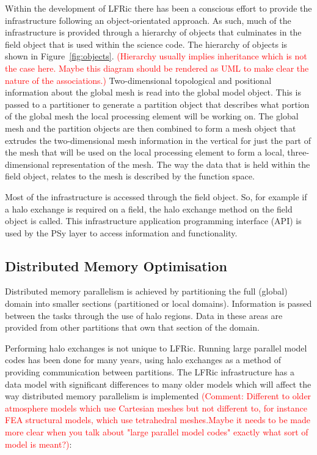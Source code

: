 \documentclass[times]{elsarticle}
\begin{document}
Within the development of LFRic there has been a conscious effort to
provide the infrastructure following an object-orientated approach. As
such, much of the infrastructure is provided through a hierarchy of
objects that culminates in the field object that is used within the
science code. The hierarchy of objects is shown in
Figure~\ref{fig:objects}. 
\textcolor{red}{(Hierarchy usually implies inheritance which is not the case here. 
Maybe this diagram should be rendered as UML to make clear the nature of the associations.)}
Two-dimensional topological and positional
information about the global mesh is read into the global model object.
This is passed to a partitioner to generate a partition object that
describes what portion of the global mesh the local processing element
will be working on. The global mesh and the partition objects are then
combined to form a mesh object that extrudes the two-dimensional mesh
information in the vertical for just the part of the mesh that will be
used on the local processing element to form a local, three-dimensional
representation of the mesh. The way the data that is held within the
field object, relates to the mesh is described by the function space.

Most of the infrastructure is accessed through the field object. So, for
example if a halo exchange is required on a field, the halo exchange
method on the field object is called. This infrastructure application
programming interface (API) is used by the PSy layer to access
information and functionality.

\subsection{\label{sec:distmem}Distributed Memory Optimisation}

Distributed memory parallelism is achieved by partitioning the full
(global) domain into smaller sections (partitioned or local domains).
Information is passed between the tasks through the use of halo regions.
Data in these areas are provided from other partitions that own that
section of the domain.

Performing halo exchanges is not unique to LFRic. Running large parallel
model codes has been done for many years, using halo exchanges as a
method of providing communication between partitions. The LFRic
infrastructure has a data model with significant differences to many
older models which will affect the way distributed memory parallelism is
implemented \textcolor{red}{(Comment: Different to older atmosphere models 
which use Cartesian meshes but not different to, for instance FEA structural 
models, which use tetrahedral meshes.Maybe it needs to be made more clear when 
you talk about "large parallel model codes" exactly what sort of model is meant?)}:
\end{document}
